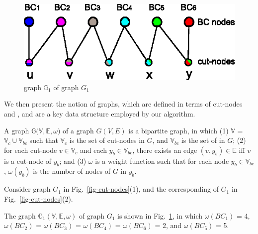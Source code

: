 \begin{figure}[tb!]
\begin{center}
\includegraphics[scale=0.9]{./sketch-graphs.eps}
\end{center}
\vspace{-1.5ex}
\caption{\bcsketch graph $\mathbb{G}_1$ of graph $G_1$}
\label{fig-sketch-graph}\vspace{-2ex}
\end{figure}

We then present the notion of \bcsketch graphs, which are defined in terms of cut-nodes and \bccs, and are a key data structure employed by our algorithm.

A \bcsketch graph $\mathbb{G(V, E}, \omega)$ of a graph $G(V, E)$ is a bipartite graph, in which (1) $\mathbb{V}$ = $\mathbb{V}_{c}\cup \mathbb{V}_{bc}$
such that $\mathbb{V}_{c}$ is the set of cut-nodes in $G$, and $\mathbb{V}_{bc}$ is the set of \bccs in $G$;
(2) for each cut-node $v\in \mathbb{V}_{c}$ and each \bc $y_{b}\in \mathbb{V}_{bc}$, there exists an edge $(v, y_b)\in \mathbb{E}$ iff $v$ is a cut-node of \bc $y_b$; and (3) $\omega$ is a weight function such that for each node $y_b\in \mathbb{V}_{bc}$, $\omega(y_b)$ is the number of nodes of $G$ in \bc $y_b$.




\vspace{-0.5ex}
\begin{example}
\label{exm-sketch-graph} Consider graph $G_1$ in Fig.~\ref{fig-cut-nodes}(1), and the corresponding \bccs of $G_1$ in Fig.~\ref{fig-cut-nodes}(2).



The \bcsketch graph $\mathbb{G}_1(\mathbb{V, E}, \omega)$ of graph $G_1$ is shown in Fig.~\ref{fig-sketch-graph},
in which $\omega(BC_1)$ = 4, $\omega(BC_2)$ = $\omega(BC_3)$ = $\omega(BC_4)$ = $\omega(BC_6)$ = 2, and $\omega(BC_5)$ = 5.
\end{example}

